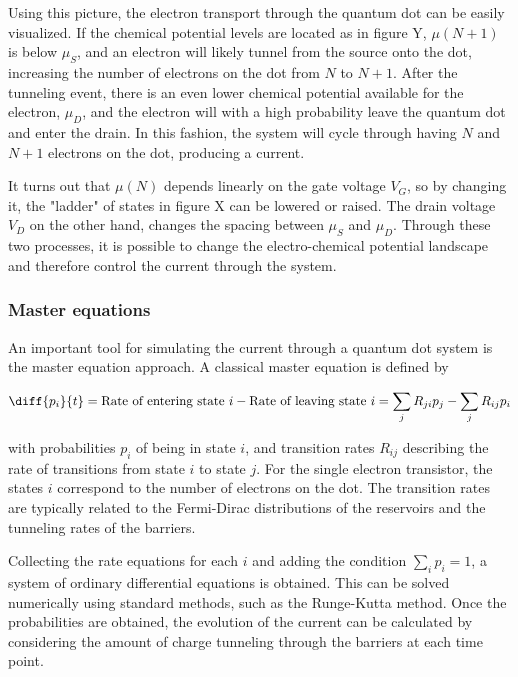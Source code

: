 \documentclass[../main.tex]{subfiles}
\begin{document}
Using this picture, the electron transport through the quantum dot can be easily visualized. If the chemical potential levels are located as in figure Y, $\mu(N + 1)$ is below $\mu_S$, and an electron will likely tunnel from the source onto the dot, increasing the number of electrons on the dot from $N$ to $N+1$. After the tunneling event, there is an even lower chemical potential available for the electron, $\mu_D$, and the electron will with a high probability leave the quantum dot and enter the drain. In this fashion, the system will cycle through having $N$ and $N+1$ electrons on the dot, producing a current.  

It turns out that $\mu(N)$ depends linearly on the gate voltage $V_G$, so by changing it, the "ladder" of states in figure X can be lowered or raised. The drain voltage $V_D$ on the other hand, changes the spacing between $\mu_S$ and $\mu_D$. Through these two processes, it is possible to change the electro-chemical potential landscape and therefore control the current through the system. 

\subsubsection{Master equations}
An important tool for simulating the current through a quantum dot system is the master equation approach. A classical master equation is defined by

\begin{equation}\label{master}
    \diff{p_i}{t} = \text{Rate of entering state } i - \text{Rate of leaving state } i = \sum_j R_{ji}p_j  - \sum_j R_{ij}p_i
\end{equation}

with probabilities $p_i$ of being in state $i$, and transition rates $R_{ij}$ describing the rate of transitions from state $i$ to state $j$. For the single electron transistor, the states $i$ correspond to the number of electrons on the dot. The transition rates are typically related to the Fermi-Dirac distributions of the reservoirs and the tunneling rates of the barriers.

Collecting the rate equations for each $i$ and adding the condition $\sum_i p_i = 1$, a system of ordinary differential equations is obtained. This can be solved numerically using standard methods, such as the Runge-Kutta method. Once the probabilities are obtained, the evolution of the current can be calculated by considering the amount of charge tunneling through the barriers at each time point.
\end{document}
